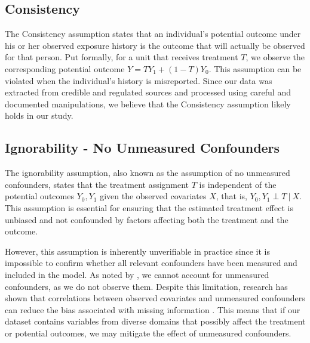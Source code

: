 \documentclass[11pt]{article}
\newcommand{\gur}[1]{{\color{teal}{Gur: #1}}}
\begin{document}
\subsection{Consistency}

The Consistency assumption states that an individual's potential outcome under his or her observed exposure history is the outcome that will actually be observed for that person. Put formally, for a unit that receives treatment $T$, we observe the corresponding potential outcome $Y = TY_1 + (1-T)Y_0$. This assumption can be violated when the individual's history is misreported. Since our data was extracted from credible and regulated sources and processed using careful and documented manipulations, we believe that the Consistency assumption likely holds in our study. 

\gur{elaborate more? Data Source Reliability, Clear Treatment Definition, Outcome Measurement, Data Processing Transparency, Stable Treatment}


\subsection{Ignorability - No Unmeasured Confounders}





The ignorability assumption, also known as the assumption of no unmeasured confounders, states that the treatment assignment \( T \) is independent of the potential outcomes \( Y_0, Y_1 \) given the observed covariates \( X \), that is, \( Y_0, Y_1 \perp T \ | \ X \). This assumption is essential for ensuring that the estimated treatment effect is unbiased and not confounded by factors affecting both the treatment and the outcome.

However, this assumption is inherently unverifiable in practice since it is impossible to confirm whether all relevant confounders have been measured and included in the model. As noted by \citet{hernan2006estimating}, we cannot account for unmeasured confounders, as we do not observe them. Despite this limitation, research has shown that correlations between observed covariates and unmeasured confounders can reduce the bias associated with missing information \citep{schulz2023no}. This means that if our dataset contains variables from diverse domains that possibly affect the treatment or potential outcomes, we may mitigate the effect of unmeasured confounders.
\end{document}
